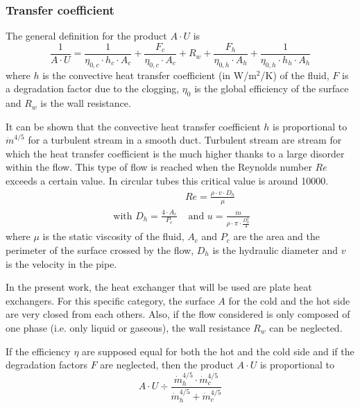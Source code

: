 \subsubsection{Transfer coefficient}
The general definition for the product $A\cdot U$ is 
\begin{equation}
\frac{1}{A\cdot U}  = \frac{1}{\eta_{0,c}\cdot h_c \cdot A_c} + \frac{F_c}{\eta_{0,c}\cdot A_c} + R_w + \frac{F_h}{\eta_{0,h}\cdot A_h} + \frac{1}{\eta_{0,h}\cdot h_h \cdot A_h}\label{eq:C3_AU}
\end{equation}
where $h$ is the convective heat transfer coefficient (in W/m$^2$/K) of the fluid, $F$ is a degradation factor due to the clogging, $\eta_0$ is the global efficiency of the surface and $R_w$ is the wall resistance. 

It can be shown that the convective heat transfer coefficient $h$ is proportional to $\dot{m}^{4/5}$ for a turbulent stream in a smooth duct. Turbulent stream are stream for which the heat transfer coefficient is the much higher thanks to a large disorder within the flow. This type of flow is reached when the Reynolds number $Re$ exceeds a certain value. In circular tubes this critical value is around 10000.
\begin{align}
&Re = \frac{\rho\cdot v\cdot D_h}{\mu}\\
\text{ with $D_h = \frac{4\cdot A_c}{P_c}$}& \text{ and $u=\frac{\dot{m}}{\rho\cdot\pi\cdot\frac{D_h^2}{4}}$}
\end{align}
where $\mu$ is the static viscosity of the fluid, $A_c$ and $P_c$ are the area and the perimeter of the surface crossed by the flow, $D_h$ is the hydraulic diameter and $v$ is the velocity in the pipe.

In the present work, the heat exchanger that will be used are plate heat exchangers. For this specific category, the surface $A$ for the cold and the hot side are very closed from each others. Also, if the flow considered is only composed of one phase (i.e. only liquid or gaseous), the wall resistance $R_w$ can be neglected. 

If the efficiency $\eta$ are supposed equal for both the hot and the cold side and if the degradation factors $F$ are neglected, then the product $A\cdot U$ is proportional to
\begin{equation}
A\cdot U \div \frac{\dot{m}_h^{4/5}\cdot\dot{m}_c^{4/5}}{\dot{m}_h^{4/5} + \dot{m}_c^{4/5}}\label{eq:C3_AU_prop}
\end{equation}
